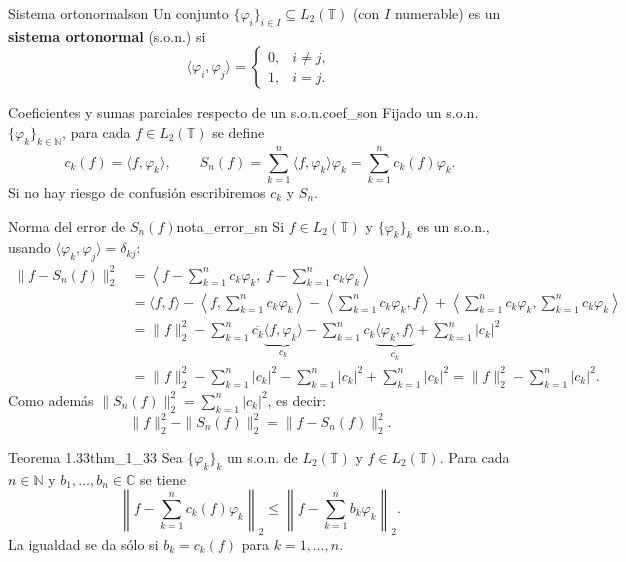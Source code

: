 \begin{definicion}{Sistema ortonormal}{son}
Un conjunto $\{\varphi_i\}_{i\in I} \subseteq L_2(\mathbb{T})$ (con $I$ numerable) es un \textbf{sistema ortonormal} (s.o.n.) si
\[
\langle \varphi_i, \varphi_j\rangle = \begin{cases} 0, & i \ne j, \\ 1, & i = j. \end{cases}
\]
\end{definicion}

\begin{definicion}{Coeficientes y sumas parciales respecto de un s.o.n.}{coef_son}
Fijado un s.o.n. $\{\varphi_k\}_{k\in\mathbb{N}}$, para cada $f \in L_2(\mathbb{T})$ se define
\[
c_k(f) = \langle f, \varphi_k\rangle, \qquad S_n(f) = \sum_{k=1}^n \langle f, \varphi_k\rangle\varphi_k = \sum_{k=1}^n c_k(f)\varphi_k.
\]
Si no hay riesgo de confusión escribiremos $c_k$ y $S_n$.
\end{definicion}

\begin{nota}{Norma del error de $S_n(f)$}{nota_error_sn}
Si $f \in L_2(\mathbb{T})$ y $\{\varphi_k\}_k$ es un s.o.n., usando $\langle \varphi_k, \varphi_j\rangle = \delta_{kj}$:
\begin{align*}
\|f - S_n(f)\|_2^2 &= \left\langle f - \sum_{k=1}^n c_k\varphi_k,\ f - \sum_{k=1}^n c_k\varphi_k\right\rangle \\
&= \langle f, f\rangle - \left\langle f, \sum_{k=1}^n c_k\varphi_k\right\rangle - \left\langle \sum_{k=1}^n c_k\varphi_k, f\right\rangle + \left\langle \sum_{k=1}^n c_k\varphi_k, \sum_{k=1}^n c_k\varphi_k\right\rangle \\
&= \|f\|_2^2 - \sum_{k=1}^n \overline{c_k}\underbrace{\langle f, \varphi_k\rangle}_{c_k} - \sum_{k=1}^n c_k\underbrace{\langle \varphi_k, f\rangle}_{\overline{c_k}} + \sum_{k=1}^n |c_k|^2 \\
&= \|f\|_2^2 - \sum_{k=1}^n |c_k|^2 - \sum_{k=1}^n |c_k|^2 + \sum_{k=1}^n |c_k|^2 = \|f\|_2^2 - \sum_{k=1}^n |c_k|^2.
\end{align*}
Como además $\|S_n(f)\|_2^2 = \sum_{k=1}^n |c_k|^2$, es decir:
\[
\|f\|_2^2 - \|S_n(f)\|_2^2 = \|f - S_n(f)\|_2^2.
\]
\end{nota}

\begin{teorema}{Teorema 1.33}{thm_1_33}
Sea $\{\varphi_k\}_k$ un s.o.n. de $L_2(\mathbb{T})$ y $f \in L_2(\mathbb{T})$. Para cada $n \in \mathbb{N}$ y $b_1, \dots, b_n \in \mathbb{C}$ se tiene
\[
\left\| f - \sum_{k=1}^n c_k(f)\varphi_k \right\|_2 \le \left\| f - \sum_{k=1}^n b_k\varphi_k \right\|_2.
\]
La igualdad se da sólo si $b_k = c_k(f)$ para $k = 1, \dots, n$.
\end{teorema}

